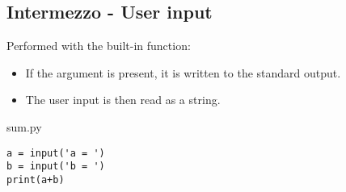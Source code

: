 \documentclass[aspectratio=1610,t]{beamer}
\begin{document}
\subsection{Intermezzo - User input}
\begin{pframe}
Performed with the  built-in function:
 \begin{itemize}
  \item If the  argument is present, it is written to the standard
        output.
  \item The user input is then read as a string.
 \end{itemize}
 \pause
 \begin{minipage}{0.40\textwidth}
 \begin{pythonfile}{sum.py}
  \begin{verbatim}
a = input('a = ')
b = input('b = ')
print(a+b)
  \end{verbatim}
 \end{pythonfile}
 \pause
 \begin{terminal}
 \end{terminal}
\end{minipage}%
 \pause
 \begin{minipage}{0.57\textwidth}
 \begin{center}
  
 \end{center}
 \end{minipage}%
\end{pframe}
\end{document}
